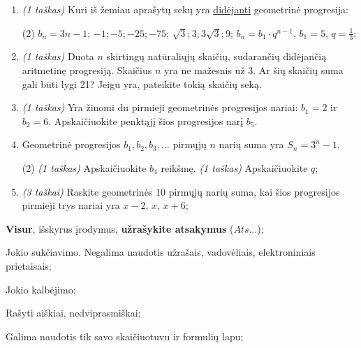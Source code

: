 \documentclass[a4paper]{article}
\begin{document}
\begin{enumerate}
      \item \textit{(1 taškas)} Kuri iš žemiau aprašytų sekų yra
            \underline{didėjanti} geometrinė progresija:
            \begin{tasks}[item-format={\normalfont}, after-item-skip=2mm,
                        label=\Alph*, label-format={\bfseries}](2)
                  \task $b_n = 3n-1$;
                  \task $-1; -5; -25; -75$;
                  \task $\sqrt{3}; 3; 3\sqrt{3}; 9$;
                  \task $b_n=b_1\cdot q^{n-1}$, $b_1 = 5$, $q = \frac{1}{3}$;
            \end{tasks}
      \item \textit{(1 taškas)}  Duota $n$ skirtingų natūraliųjų skaičių,
            sudarančių didėjančią
            aritmetinę progresiją. Skaičius $n$ yra ne mažesnis už 3. Ar šių
            skaičių suma
            gali būti lygi 21? Jeigu yra, pateikite tokią skaičių seką.
      \item \textit{(1 taškas)}  Yra žinomi du pirmieji geometrinės progresijos
            nariai: $b_1 = 2$ ir $b_2 = 6$. Apskaičiuokite penktąjį šios
            progresijos narį
            $b_5$.
      \item Geometrinė progresijos $b_1, b_2, b_3, \ldots$ pirmųjų $n$ narių
            suma yra $S_{n} = 3^{n}-1$.
            \begin{tasks}[item-format={\normalfont}, after-item-skip=2mm](2)
                  \task \textit{(1 taškas)} Apskaičiuokite $b_4$ reikšmę.
                  \task \textit{(1 taškas)} Apskaičiuokite $q$;
            \end{tasks}
      \item \textit{(3 taškai)} Raskite geometrinės 10 pirmųjų narių
            suma, kai šios progresijos pirmieji trys nariai yra $x-2$, $x$,
            $x+6$;
\end{enumerate}

\begin{small}
      \begin{enumerate*}[label={(\arabic*)}]
            \item \textbf{Visur}, išskyrus įrodymus, \textbf{užrašykite
                  atsakymus} ($Ats\ldots$);
            \item Jokio sukčiavimo. Negalima naudotis užrašais, vadovėliais,
            elektroniniais prietaisais;
            \item Jokio kalbėjimo;
            \item Rašyti aiškiai, nedviprasmiškai;
            \item Galima naudotis tik savo skaičiuotuvu ir formulių lapu;
      \end{enumerate*}
\end{small}
\end{document}
